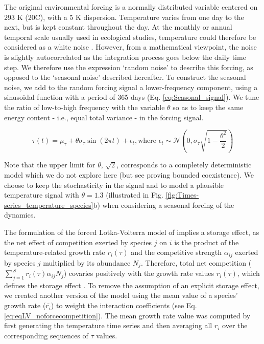 \documentclass[a4paper,12pt]{article}
\begin{document}
The original environmental forcing is a normally distributed variable
centered on 293 K (20\textdegree C), with a 5 K dispersion. Temperature varies
from one day to the next, but is kept constant throughout the day.
At the monthly or annual temporal scale usually used in ecological
studies, temperature could therefore be considered as a white noise
\citep{vasseur_color_2004}. However, from a mathematical viewpoint,
the noise is slightly autocorrelated as the integration process goes
below the daily time step. We therefore use the expression `random
noise' to describe this forcing, as opposed to the `seasonal noise'
described hereafter. To construct the seasonal noise, we add to the
random forcing signal a lower-frequency component, using a sinusoidal
function with a period of 365 days (Eq. \ref{eq:Seasonal_signal}).
We tune the ratio of low-to-high frequency with the variable $\theta$
so as to keep the same energy content - i.e., equal total variance
- in the forcing signal.

\begin{equation}
\tau(t)=\mu_{\tau}+\theta\sigma_{\tau}\sin\left(2\pi t\right)+\epsilon_{t},\text{where }\epsilon_{t}\sim\mathcal{N}\left(0,\sigma_{\tau}\sqrt{1-\frac{\theta^{2}}{2}}\right)\label{eq:Seasonal_signal}
\end{equation}

Note that the upper limit for $\theta$, $\sqrt{2}$, corresponds
to a completely deterministic model which we do not explore here (but
see \citet{zhao1991qualitative} proving bounded coexistence). We
choose to keep the stochasticity in the signal and to model a plausible
temperature signal with $\theta=1.3$ (illustrated in Fig. \ref{fig:Times-series_temperature_species}b)
when considering a seasonal forcing of the dynamics.

The formulation of the forced Lotka-Volterra model of \citet{scranton_coexistence_2016}
implies a storage effect, as the net effect of competition exerted
by species $j$ on $i$ is the product of the temperature-related
growth rate $r_{i}(\tau)$ and the competitive strength $\alpha_{ij}$
exerted by species $j$ multiplied by its abundance $N_{j}$. Therefore,
total net competition ($\sum_{j=1}^{S}r_{i}(\tau)\alpha_{ij}N_{j}$)
covaries positively with the growth rate values $r_{i}(\tau)$, which
defines the storage effect \citep{chesson_multispecies_1994,fox_intermediate_2013,ellner_how_2016}.
To remove the assumption of an explicit storage effect, we created
another version of the model using the mean value of a species' growth
rate ($\bar{r_{i}}$) to weight the interaction coefficients (see
Eq. \ref{eq:eqLV_noforcecompetition}). The mean growth rate value
was computed by first generating the temperature time series and then
averaging all $r_{i}$ over the corresponding sequences of $\tau$
values. 
\end{document}
